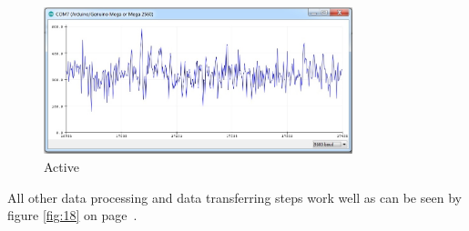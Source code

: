 \documentclass[12pt,]{article}
\numberwithin{figure}{section}
\begin{document}
\begin{figure}[H]
	\begin{center}
		\includegraphics[width=0.8\textwidth]{28}
	\end{center}
    \caption{Active}
	\label{fig:40}
\end{figure}
All other data processing and data transferring steps work well as can be seen by figure \ref{fig:18} on page~\pageref{fig:18}. 
\end{document}

